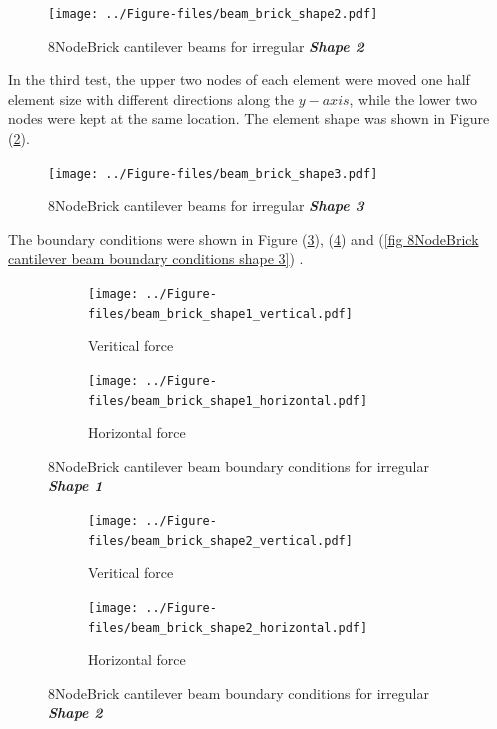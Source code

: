 \documentclass[fleqn,11pt]{article}
\begin{document}
\begin{figure}[H]
  \centering
  \texttt{[image: ../Figure-files/beam\_brick\_shape2.pdf]}
  \caption{8NodeBrick cantilever beams for irregular \textbf{\emph{Shape 2}} }
  \label{fig irregular shape 2 8NodeBrick cantilever beams }
\end{figure}



In the third test, the upper two nodes of each element were moved one half element size with different directions along the $y-axis$, while the lower two nodes were kept at the same location. The element shape was shown in Figure (\ref{fig irregular shape 3 8NodeBrick cantilever beams }).

\begin{figure}[H]
  \centering
  \texttt{[image: ../Figure-files/beam\_brick\_shape3.pdf]}
  \caption{8NodeBrick cantilever beams for irregular \textbf{\emph{Shape 3}} }
  \label{fig irregular shape 3 8NodeBrick cantilever beams }
\end{figure}

The boundary conditions were shown in Figure (\ref{fig 8NodeBrick cantilever beam boundary conditions shape 1}), (\ref{fig 8NodeBrick cantilever beam boundary conditions shape 2}) and (\ref{fig 8NodeBrick cantilever beam boundary conditions shape 3}) .

\begin{figure}[H]
  \centering
    \begin{subfigure}{0.5\textwidth}
      \centering
      \texttt{[image: ../Figure-files/beam\_brick\_shape1\_vertical.pdf]}
      \caption{Veritical force}
    \end{subfigure}
    \begin{subfigure}{0.5\textwidth}
      \centering
      \texttt{[image: ../Figure-files/beam\_brick\_shape1\_horizontal.pdf]}
      \caption{Horizontal force}
    \end{subfigure}
  \caption{8NodeBrick cantilever beam boundary conditions for irregular \textbf{\emph{Shape 1}} }
  \label{fig 8NodeBrick cantilever beam boundary conditions shape 1}
\end{figure}


\begin{figure}[H]
  \centering
    \begin{subfigure}{0.5\textwidth}
      \centering
      \texttt{[image: ../Figure-files/beam\_brick\_shape2\_vertical.pdf]}
      \caption{Veritical force}
    \end{subfigure}
    \begin{subfigure}{0.5\textwidth}
      \centering
      \texttt{[image: ../Figure-files/beam\_brick\_shape2\_horizontal.pdf]}
      \caption{Horizontal force}
    \end{subfigure}
  \caption{8NodeBrick cantilever beam boundary conditions for irregular \textbf{\emph{Shape 2}} }
  \label{fig 8NodeBrick cantilever beam boundary conditions shape 2}
\end{figure}
\end{document}
